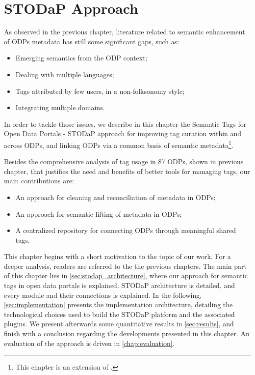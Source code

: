 \chapter{STODaP Approach}
\label{chap:tagging}

As observed in the previous chapter, literature related to semantic enhancement of ODPs metadata has still some significant gaps, such as:
\begin{itemize}
	\item Emerging semantics from the ODP context;
	\item Dealing with multiple languages;
	\item Tags attributed by few users, in a non-folksonomy style;
	\item Integrating multiple domains.
\end{itemize}

In order to	tackle those issues, we describe in this chapter the Semantic Tags for Open Data Portals - STODaP approach for improving tag curation within and across ODPs, and linking ODPs via a common basis of semantic metadata\footnote{This chapter is an extension of .}.

Besides the comprehensive analysis of tag usage in 87 ODPs, shown in previous chapter, that justifies the need and benefits of better tools for managing tags, our main contributions are:
\begin{itemize}
	\item An approach for cleaning and reconciliation of metadata in ODPs;
	\item An approach for semantic lifting of metadata in ODPs;
	\item A centralized repository for connecting ODPs through meaningful shared tags.
\end{itemize}

This chapter begins with a short motivation to the topic of our work.
For a deeper analysis, readers are referred to the the previous chapters.
The main part of this chapter lies in \autoref{sec:stodap_architecture}, where our approach for semantic tags in open data portals is explained.
STODaP architecture is detailed, and every module and their connections is explained.
In the following, \autoref{sec:implementation} presents the implementation architecture, detailing the technological choices used to build the STODaP platform and the associated plugins.
We present afterwards some quantitative results in \autoref{sec:results}, and finish with a conclusion regarding the developments presented in this chapter.
An evaluation of the approach is driven in \autoref{chap:evaluation}.

